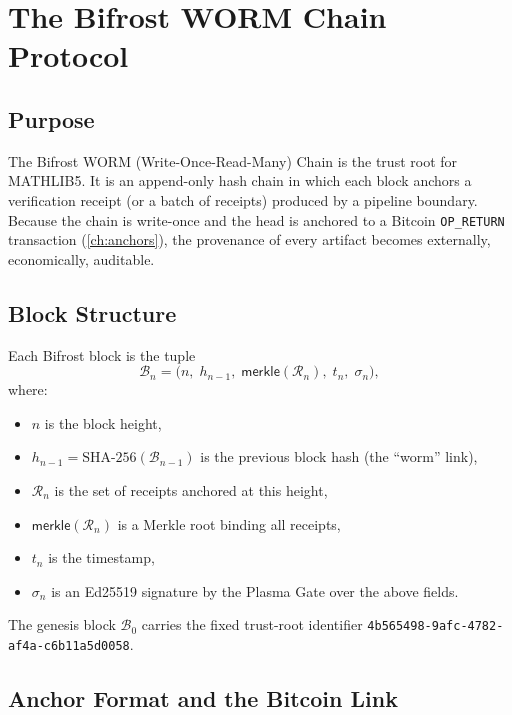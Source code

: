 \chapter{The Bifrost WORM Chain Protocol}
\label{ch:bifrost}

\section{Purpose}
\label{sec:bifrost-purpose}

The Bifrost WORM (Write-Once-Read-Many) Chain is the trust root for
MATHLIB5. It is an append-only hash chain in which each block anchors a
verification receipt (or a batch of receipts) produced by a pipeline
boundary. Because the chain is write-once and the head is anchored to a
Bitcoin \texttt{OP\_RETURN} transaction (\cref{ch:anchors}), the provenance
of every artifact becomes externally, economically, auditable.

\section{Block Structure}
\label{sec:bifrost-block}

Each Bifrost block is the tuple
\[
\mathcal{B}_n = \bigl(n,\; h_{n-1},\; \mathsf{merkle}(\mathcal{R}_n),\;
t_n,\; \sigma_n \bigr),
\]
where:
\begin{itemize}
  \item $n$ is the block height,
  \item $h_{n-1} = \text{SHA-256}(\mathcal{B}_{n-1})$ is the previous block
        hash (the ``worm'' link),
  \item $\mathcal{R}_n$ is the set of receipts anchored at this height,
  \item $\mathsf{merkle}(\mathcal{R}_n)$ is a Merkle root binding all
        receipts,
  \item $t_n$ is the timestamp,
  \item $\sigma_n$ is an Ed25519 signature by the Plasma Gate over the
        above fields.
\end{itemize}
The genesis block $\mathcal{B}_0$ carries the fixed trust-root identifier
\texttt{4b565498-9afc-4782-af4a-c6b11a5d0058}.

\section{Anchor Format and the Bitcoin Link}
\label{sec:bifrost-anchor}

